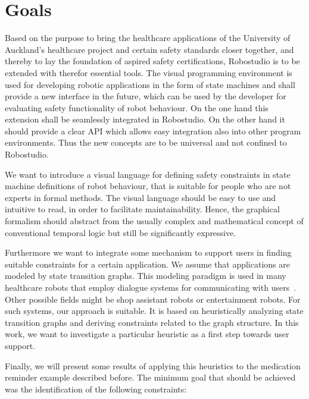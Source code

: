 \chapter{Goals}
\label{chap:goals}


Based on the purpose to bring the healthcare applications of the University of Auckland's healthcare project and certain safety standards closer together, and thereby to lay the foundation of aspired safety certifications, Robostudio is to be extended with therefor essential tools. The visual programming environment is used for developing robotic applications in the form of state machines and shall provide a new interface in the future, which can be used by the developer for evaluating safety functionality of robot behaviour. On the one hand this extension shall be seamlessly integrated in Robostudio. On the other hand it should provide a clear API which allows easy integration also into other program environments. Thus the new concepts are to be universal and not confined to Robostudio.

We want to introduce a visual language for defining safety constraints in state machine definitions of robot behaviour, that is suitable for people who are not experts in formal methods. The visual language should be easy to use and intuitive to read, in order to facilitate maintainability.
Hence, the graphical formalism should abstract from the usually complex and mathematical concept of conventional temporal logic but still be significantly expressive.
 
Furthermore we want to integrate some mechanism to support users in finding suitable constraints for a certain application. We assume that applications are modeled by state transition graphs. This modeling paradigm is used in many healthcare robots that employ dialogue systems for communicating with users~\cite{Bickmore2006}. Other possible fields might be shop assistant robots or entertainment robots. For such systems, our approach is suitable. It is based on heuristically analyzing state transition graphs and deriving constraints related to the graph structure. In this work, we want to investigate a particular heuristic as a first step towards user support. 

Finally, we will present some results of applying this heuristics to the medication reminder example described before. The minimum goal that should be achieved was the identification of the following constraints:

